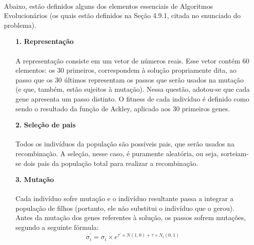 \documentclass{report}
\begin{document}
	\paragraph{}	 Abaixo, estão definidos alguns dos elementos essenciais de Algoritmos Evolucionários (os quais estão definidos na Seção 4.9.1, citada no enunciado do problema).\\
	
	\begin{itemize}
		
		\item[\textbf{1.}] \textbf{Representação}
		
		\paragraph{} A representação consiste em um vetor de números reais. Esse vetor contém 60 elementos: os 30 primeiros, correspondem à solução propriamente dita, ao passo que os 30 últimos representam os passos que serão usados na mutação (e que, também, estão sujeitos à mutação). Nessa questão, adotou-se que cada gene apresenta um passo distinto. O fitness de cada indivíduo é definido como sendo o resultado da função de Ackley, aplicado aos 30 primeiros genes.\\
		
		\item[\textbf{2.}] \textbf{Seleção de pais}
	
		\paragraph{} Todos os indivíduos da população são possíveis pais, que serão usados na recombinação. A seleção, nesse caso, é puramente aleatória, ou seja, sorteiam-se dois pais da população total para realizar a recombinação.\\
		
		\item[\textbf{3.}] \textbf{Mutação}
		
		\paragraph{} Cada indivíduo sofre mutação e o indivíduo resultante passa a integrar a população de filhos (portanto, ele não substitui o indivíduo que o gerou). Antes da mutação dos genes referentes à solução, os passos sofrem mutações, segundo a seguinte fórmula:\\
		
		\begin{equation*}
		\sigma_i^{'} = \sigma_i \times e^{\tau^{'} \times N(1,0) + \tau \times N_i(0,1)}
		\end{equation*}
		

\end{itemize}
\end{document}
